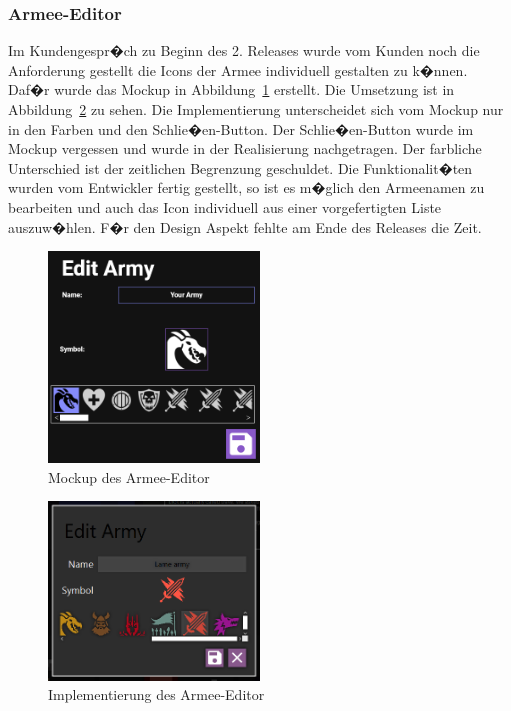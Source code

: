 \documentclass[12pt, titlepage]{scrartcl}
\newcommand{\Abb}[1]{%
	Abbildung\ \ref{#1}%
}
\begin{document}
			\subsubsection{Armee-Editor}
			Im Kundengespr�ch zu Beginn des 2. Releases wurde vom Kunden noch die Anforderung gestellt die Icons der Armee individuell gestalten zu k�nnen. Daf�r wurde das Mockup in \Abb{ArmyEditorMockUp} erstellt. Die Umsetzung ist in \Abb{ArmyEditorImplementation} zu sehen. Die Implementierung unterscheidet sich vom Mockup nur in den Farben und den Schlie�en-Button. Der Schlie�en-Button wurde im Mockup vergessen und wurde in der Realisierung nachgetragen. Der farbliche Unterschied ist der zeitlichen Begrenzung geschuldet. Die Funktionalit�ten wurden vom Entwickler fertig gestellt, so ist es m�glich den Armeenamen zu bearbeiten und auch das Icon individuell aus einer vorgefertigten Liste auszuw�hlen. F�r den Design Aspekt fehlte am Ende des Releases die Zeit.
			
			\begin{figure}[H] 
				\centering
				\includegraphics[width=0.5\textwidth]{ArmyEditor.png}
				\caption{Mockup des Armee-Editor}
				\label{ArmyEditorMockUp}
			\end{figure}
		
			\begin{figure}[H] 
				\centering
				\includegraphics[width=0.5\textwidth]{ArmyEditor_final.PNG}
				\caption{Implementierung des Armee-Editor}
				\label{ArmyEditorImplementation}
			\end{figure}
		
\end{document}
